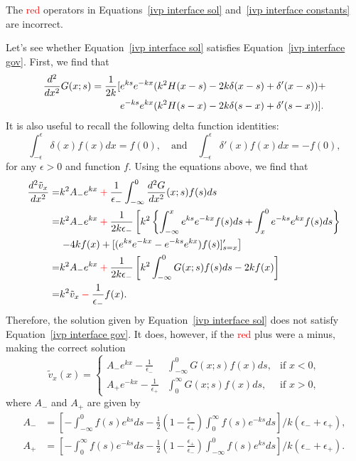 \documentclass[12pt]{../style-files/ociamthesis}
\begin{document}
The \textcolor{red}{red} operators in Equations~\eqref{ivp interface sol} and~\eqref{ivp interface constants} are incorrect.

Let's see whether Equation~\eqref{ivp interface sol} satisfies Equation~\eqref{ivp interface gov}. First, we find that
\begin{align}
\frac{d^2}{dx^2} G(x;s) = \frac{1}{2k}[& e^{ks}e^{-kx}(k^2H(x-s) - 2k\delta(x-s) + \delta'(x-s)) + \notag \\
& e^{-ks}e^{kx}(k^2H(s-x) - 2k\delta(s-x) + \delta'(s-x))].
\end{align}
It is also useful to recall the following delta function identities:
\begin{equation}
\int_{-\epsilon}^\epsilon \delta(x)f(x) dx = f(0), \quad \text{and} \quad \int_{-\epsilon}^\epsilon \delta'(x)f(x) dx = -f(0),
\end{equation}
for any $\epsilon > 0$ and function $f$. Using the equations above, we find that
\begin{align}
\frac{d^2\tilde{v}_x}{dx^2} = & k^2A_-e^{kx} \: \textcolor{red}{+} \: \frac{1}{\epsilon_-}\int_{-\infty}^0 \frac{d^2G}{dx^2}(x;s) f(s) ds \\
= & k^2A_-e^{kx} \: \textcolor{red}{+} \: \frac{1}{2k\epsilon_-}\left[k^2\left\{\int_{-\infty}^x e^{ks}e^{-kx}f(s) ds  + \int_x^0 e^{-ks}e^{kx}f(s) ds\right\} \right. \\
& \left.- 4kf(x) + [(e^{ks}e^{-kx}-e^{-ks}e^{kx})f(s)]'_{s=x} \right] \\
= & k^2A_-e^{kx} \: \textcolor{red}{+} \: \frac{1}{2k\epsilon_-}\left[k^2\int_{-\infty}^0 G(x;s)f(s) ds - 2kf(x) \right] \\
= & k^2\tilde{v}_x \: \textcolor{red}{-} \: \frac{1}{\epsilon_-}f(x).
\label{ivp interface error}
\end{align}
Therefore, the solution given by Equation~\eqref{ivp interface sol} does not satisfy Equation~\eqref{ivp interface gov}. It does, however, if the \textcolor{red}{red} plus were a minus, making the correct solution 
\begin{equation}
\tilde{v}_x(x) = \left\{
\begin{aligned}
A_-e^{kx} - \frac{1}{\epsilon_-} & \int_{-\infty}^{0} G(x;s)f(x)ds, & \text{if  } x<0,\\
A_+e^{-kx} - \frac{1}{\epsilon_+} & \int_{0}^{\infty} G(x;s)f(x)ds, & \text{if  } x>0,
\end{aligned}
\right.
\label{ivp interface sol correct}
\end{equation}
where $A_-$ and $A_+$ are given by
\begin{align}
A_- & = \left[- \int_{-\infty}^0 f(s)e^{ks} ds - \frac{1}{2}\left(1 - \frac{\epsilon_-}{\epsilon_+}\right)\int_0^\infty f(s)e^{-ks} ds\right] / k(\epsilon_- + \epsilon_+), \\
A_+ & = \left[-\int_0^\infty f(s)e^{-ks} ds - \frac{1}{2}\left(1 - \frac{\epsilon_+}{\epsilon_-}\right)\int_{-\infty}^0 f(s)e^{ks} ds\right] / k(\epsilon_- + \epsilon_+).
\end{align}
\end{document}
